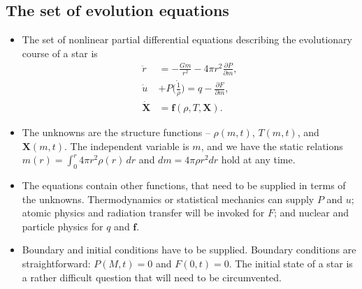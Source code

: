 \documentclass[]{article}
\newcommand{\V}[1]{\mathbf{#1}}
\newcommand{\di}{\partial} %
\begin{document}
\subsection{The set of evolution equations}
\begin{itemize}
\item The set of nonlinear partial differential equations describing the
evolutionary course of a star is
\begin{subequations}
\begin{align}\label{eq:set}
\ddot{r} &= -\frac{Gm}{r^2}-4\pi{r}^2\frac{\di{P}}{\di{m}},\\
\dot{u} &+ P\dot{\biggl(\frac{1}{\rho}\biggr)} = q - \frac{\di{F}}{\di{m}},\\
\dot{\V{X}} &= \V{f}(\rho,T,\V{X}).
\end{align}
\end{subequations}

\item The unknowns are the structure functions -- $\rho(m,t)$, $T(m,t)$, and
$\V{X}(m,t)$. The independent variable is $m$, and we have the static relations
$m(r)=\int_0^r4\pi{}r^2\rho(r)\,dr$ and $dm=4\pi\rho{}r^2dr$ hold at any time.

\item The equations contain other functions, that need to be supplied in terms
of the unknowns. Thermodynamics or statistical mechanics can supply $P$ and $u$;
atomic physics and radiation transfer will be invoked for $F$; and nuclear and
particle physics for $q$ and $\V{f}$.

\item Boundary and initial conditions have to be supplied. Boundary conditions
are straightforward: $P(M,t)=0$ and $F(0,t)=0$. The initial state of a star is a
rather difficult question that will need to be circumvented.
\end{itemize}
\end{document}
